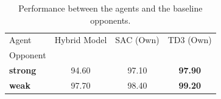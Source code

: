\begin{table}[h]
\caption{Performance between the agents and the baseline opponents.} \centering {}
\label{tab:performance_opponents}
\begin{tabular}{lccc}
\toprule
Agent & Hybrid Model & SAC (Own) & TD3 (Own) \\
Opponent &  &  &  \\
\midrule
\textbf{strong} & 94.60 & 97.10 & \textbf{97.90} \\
\textbf{weak} & 97.70 & 98.40 & \textbf{99.20} \\
\bottomrule
\end{tabular}
\end{table}
